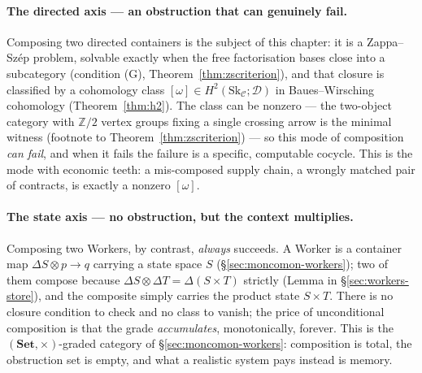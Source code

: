 \documentclass[11pt,a4paper]{book}
\newcommand{\Set}{\mathbf{Set}}
\theoremstyle{plain}
\theoremstyle{definition}
\theoremstyle{remark}
\begin{document}
\paragraph{The directed axis --- an obstruction that can genuinely fail.}
Composing two directed containers is the subject of this chapter: it is a
Zappa--Sz\'ep problem, solvable exactly when the free factorisation bases close
into a subcategory (condition (G), Theorem~\ref{thm:zscriterion}), and that closure
is classified by a cohomology class $[\omega]\in H^{2}(\mathrm{Sk}_{\mathcal C};\mathcal D)$
in Baues--Wirsching cohomology (Theorem~\ref{thm:h2}). The class can be nonzero ---
the two-object category with $\mathbb Z/2$ vertex groups fixing a single crossing
arrow is the minimal witness (footnote to Theorem~\ref{thm:zscriterion}) --- so
this mode of composition \emph{can fail}, and when it fails the failure is a
specific, computable cocycle. This is the mode with economic teeth: a mis-composed
supply chain, a wrongly matched pair of contracts, is exactly a nonzero $[\omega]$.

\paragraph{The state axis --- no obstruction, but the context multiplies.}
Composing two Workers, by contrast, \emph{always} succeeds. A Worker is a container
map $\Delta S\otimes p\to q$ carrying a state space $S$
(\S\ref{sec:moncomon-workers}); two of them compose because $\Delta S\otimes\Delta T
=\Delta(S\times T)$ strictly (Lemma in \S\ref{sec:workers-store}), and the composite
simply carries the product state $S\times T$. There is no closure condition to
check and no class to vanish; the price of unconditional composition is that the
grade \emph{accumulates}, monotonically, forever. This is the $(\Set,\times)$-graded
category of \S\ref{sec:moncomon-workers}: composition is total, the obstruction set
is empty, and what a realistic system pays instead is memory.
\end{document}
